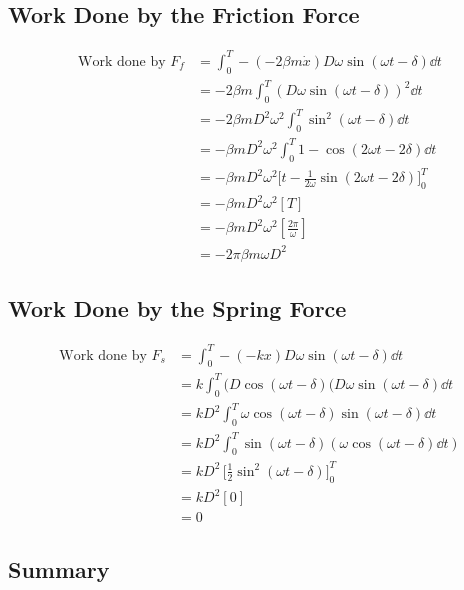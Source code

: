 \documentclass{article}
\begin{document}
\subsection{Work Done by the Friction Force}
\begin{equation*}
\begin{aligned}
\text{Work done by } F_f &= \int_0^T -(-2\beta m \dot{x})D\omega\sin(\omega t-\delta)\dd t \\
&= -2\beta m\int_0^T (D\omega\sin(\omega t-\delta))^2\dd t \\
&= -2\beta mD^2\omega^2\int_0^T \sin^2(\omega t - \delta) \dd t \\
&= -\beta mD^2\omega^2\int_0^T 1 - \cos(2\omega t - 2\delta) \dd t \\
&= -\beta mD^2\omega^2\Bigg[t - \frac{1}{2\omega}\sin(2\omega t - 2\delta)\Bigg]_0^T \\
&= -\beta mD^2\omega^2[T] \\
&= -\beta mD^2\omega^2\left[\frac{2\pi}{\omega}\right] \\
&= -2\pi\beta m\omega D^2
\end{aligned}
\end{equation*}

\subsection{Work Done by the Spring Force}

\begin{equation*}
\begin{aligned}
\text{Work done by } F_s &= \int_0^T -(-kx)D\omega\sin(\omega t-\delta)\dd t \\
&= k\int_0^T (D\cos(\omega t - \delta)(D\omega\sin(\omega t-\delta)\dd t \\
&= kD^2\int_0^T \omega\cos(\omega t - \delta)\sin(\omega t - \delta) \dd t \\
&= kD^2\int_0^T \sin(\omega t - \delta)(\omega\cos(\omega t - \delta)\dd t) \\
&= kD^2\,\Bigg[\frac{1}{2}\sin^2(\omega t - \delta)\Bigg]_0^T \\
&= kD^2[0] \\
&= 0
\end{aligned}
\end{equation*}

\subsection{Summary}
\end{document}
